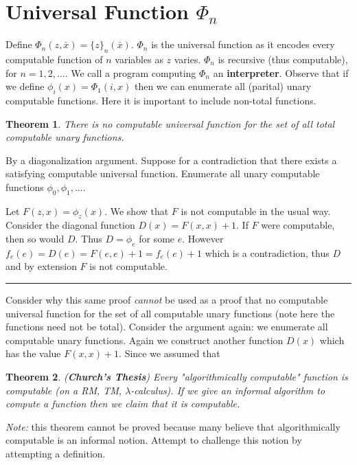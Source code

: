 \documentclass[twoside]{article}
\newcounter{lecnum}
\newtheorem{theorem}{Theorem}[lecnum]
\newenvironment{proof}{{\bf Proof:}}{\hfill\rule{2mm}{2mm}}
\begin{document}
\section{Universal Function $\Phi_n$}
Define $\Phi_n(z, \bar{x}) = \{z\}_n(\bar{x})$. $\Phi_n$ is the universal function as it encodes every computable function of $n$ variables as $z$ varies. $\Phi_n$ is recursive (thus computable), for $n = 1, 2, ...$. We call a program computing $\Phi_n$ an \textbf{interpreter}. Observe that if we define $\phi_i(x) = \Phi_1(i,x)$ then we can enumerate all (parital) unary computable functions. Here it is important to include non-total functions.

\begin{theorem}
There is no computable universal function for the set of all total computable unary functions.
\end{theorem}
\begin{proof}
By a diagonalization argument. Suppose for a contradiction that there exists a satisfying computable universal function. Enumerate all unary computable functions $\phi_0, \phi_1, ...$. 

Let $F(z,x) = \phi_z(x)$. We show that $F$ is not computable in the usual way. Consider the diagonal function $D(x) = F(x,x) + 1$. If $F$ were computable, then so would $D$. Thus $D = \phi_e$ for some $e$. However $f_e(e) = D(e) = F(e,e) + 1 = f_e(e) + 1$ which is a contradiction, thus $D$ and by extension $F$ is not computable.  
\end{proof}

Consider why this same proof \emph{cannot} be used as a proof that no computable universal function for the set of all computable unary functions (note here the functions need not be total). Consider the argument again: we enumerate all computable unary functions. Again we construct another function $D(x)$ which has the value $F(x,x) + 1$. Since we assumed that  

\begin{theorem}
(\textbf{Church's Thesis}) Every "algorithmically computable" function is computable (on a RM, TM, $\lambda$-calculus). If we give an informal algorithm to compute a function then we claim that it is computable.
\end{theorem}
\emph{Note:} this theorem cannot be proved because many believe that algorithmically computable is an informal notion. Attempt to challenge this notion by attempting a definition.
\end{document}
